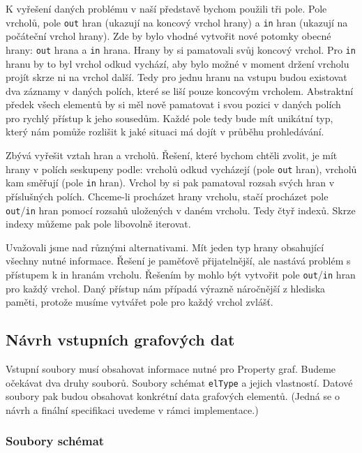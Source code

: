 K vyřešení daných problému v naší představě bychom použili tři pole.
Pole vrcholů, pole \texttt{out} hran (ukazují na koncový vrchol hrany) a \texttt{in} hran (ukazují na počáteční vrchol hrany). 
Zde by bylo vhodné vytvořit nové potomky obecné hrany: \texttt{out} hrana a \texttt{in} hrana.
Hrany by si pamatovali svůj koncový vrchol.
Pro \texttt{in} hranu by to byl vrchol odkud vychází, aby bylo možné v moment držení vrcholu projít skrze ni na vrchol další.
Tedy pro jednu hranu na vstupu budou existovat dva záznamy v daných polích, které se liší pouze koncovým vrcholem.
Abstraktní předek všech elementů by si měl nově pamatovat i svou pozici v daných polích pro rychlý přístup k jeho sousedům.
Každé pole tedy bude mít unikátní typ, který nám pomůže rozlišit k jaké situaci má dojít v průběhu prohledávání.

Zbývá vyřešit vztah hran a vrcholů.
Řešení, které bychom chtěli zvolit, je mít hrany v polích seskupeny podle: vrcholů odkud vycházejí (pole \texttt{out} hran), vrcholů kam směřují (pole \texttt{in} hran).
Vrchol by si pak pamatoval rozsah svých hran v příslušných polích. 
Chceme-li procházet hrany vrcholu, stačí procházet pole \texttt{out}/\texttt{in} hran pomocí rozsahů uložených v daném vrcholu.
Tedy čtyř indexů.
Skrze indexy můžeme pak pole libovolně iterovat.

Uvažovali jsme nad různými alternativami. 
Mít jeden typ hrany obsahující všechny nutné informace.
Řešení je paměťově přijatelnější, ale nastává problém s přístupem k in hranám vrcholu.
Řešením by mohlo být vytvořit pole \texttt{out}/\texttt{in} hran pro každý vrchol. 
Daný přístup nám případá výrazně náročnější z hlediska paměti, protože musíme vytvářet pole pro každý vrchol zvlášť. 

\subsection{Návrh vstupních grafových dat} \label{anal.vstup}

Vstupní soubory musí obsahovat informace nutné pro Property graf.
Budeme očekávat dva druhy souborů.
Soubory schémat \texttt{elType} a jejich vlastností.
Datové soubory pak budou obsahovat konkrétní data grafových elementů.
(Jedná se o návrh a finální specifikaci uvedeme v rámci implementace.)

\subsubsection{Soubory schémat}

